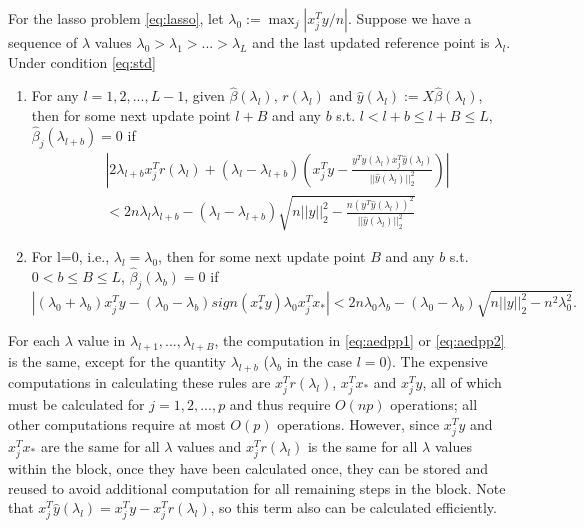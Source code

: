 \begin{theorem}
    For the lasso problem \eqref{eq:lasso}, let $\lambda_0:=\max_j|x_j^Ty/n|$. Suppose we have a sequence of $\lambda$ values $\lambda_0>\lambda_1>...>\lambda_L$ and the last updated reference point is $\lambda_l$. Under condition \eqref{eq:std}
    \begin{enumerate}
        \item For any $l=1,2,...,L-1$, given $\hat{\beta}(\lambda_l)$, $r(\lambda_l)$ and $\hat{y}(\lambda_l):=X\hat{\beta}(\lambda_l)$, then for some next update point $l+B$ and any $b$ s.t. $l<l+b\leq l+B\leq L$, $\hat{\beta}_j(\lambda_{l+b})=0$ if
        \begin{equation}
            \label{eq:aedpp1}
            \begin{split}
                &\left|2\lambda_{l+b}x_j^Tr(\lambda_l)+(\lambda_l-\lambda_{l+b})\left( x_j^Ty-\frac{y^T\hat{y}(\lambda_l)x_j^T\hat{y}(\lambda_l)}{||\hat{y}(\lambda_l)||_2^2}\right)\right|\\&<2n\lambda_l\lambda_{l+b}-(\lambda_l-\lambda_{l+b})\sqrt{n||y||_2^2-\frac{n(y^T\hat{y}(\lambda_l))^2}{||\hat{y}(\lambda_l)||_2^2}}
            \end{split}
        \end{equation}
        \item For l=0, i.e., $\lambda_l=\lambda_0$, then for some next update point $B$ and any $b$ s.t. $0<b\leq B\leq L$, $\hat{\beta}_j(\lambda_{b})=0$ if
        \begin{equation}
            \label{eq:aedpp2}
            |(\lambda_0+\lambda_b)x_j^Ty-(\lambda_0-\lambda_b)sign(x_*^Ty)\lambda_0x_j^Tx_*|<2n\lambda_0\lambda_b-(\lambda_0-\lambda_b)\sqrt{n||y||_2^2-n^2\lambda_0^2}.
        \end{equation}
    \end{enumerate}
\end{theorem}

For each $\lambda$ value in $\lambda_{l+1},...,\lambda_{l+B}$, the computation in \eqref{eq:aedpp1} or \eqref{eq:aedpp2} is the same, except for the quantity $\lambda_{l+b}$ ($\lambda_b$ in the case $l=0$). The expensive computations in calculating these rules are $x_j^Tr(\lambda_l)$, $x_j^Tx_*$ and $x_j^Ty$, all of which must be calculated for $j=1,2,...,p$ and thus require $O(np)$ operations; all other computations require at most $O(p)$ operations. However, since $x_j^Ty$ and $x_j^Tx_*$ are the same for all $\lambda$ values and $x_j^Tr(\lambda_l)$ is the same for all $\lambda$ values within the block, once they have been calculated once, they can be stored and reused to avoid additional computation for all remaining steps in the block.  Note that $x_j^T\hat{y}(\lambda_l)=x_j^Ty-x_j^Tr(\lambda_l)$, so this term also can be calculated efficiently.

